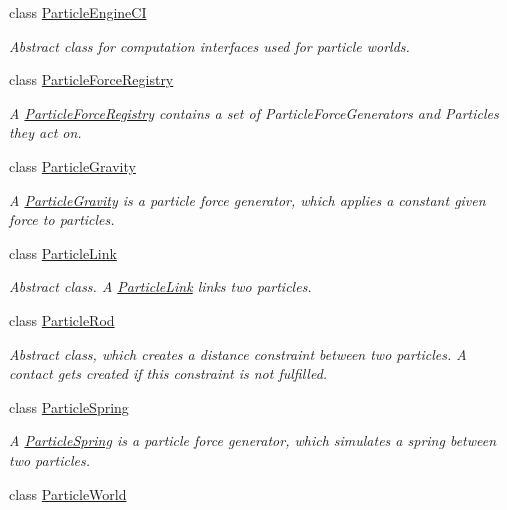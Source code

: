 \begin{DoxyCompactItemize}
class \mbox{\hyperlink{classr3_1_1_particle_engine_c_i}{Particle\+Engine\+CI}}
\begin{DoxyCompactList}\small\item\em Abstract class for computation interfaces used for particle worlds. \end{DoxyCompactList}\item 
class \mbox{\hyperlink{classr3_1_1_particle_force_registry}{Particle\+Force\+Registry}}
\begin{DoxyCompactList}\small\item\em A \mbox{\hyperlink{classr3_1_1_particle_force_registry}{Particle\+Force\+Registry}} contains a set of Particle\+Force\+Generators and Particles they act on. \end{DoxyCompactList}\item 
class \mbox{\hyperlink{classr3_1_1_particle_gravity}{Particle\+Gravity}}
\begin{DoxyCompactList}\small\item\em A \mbox{\hyperlink{classr3_1_1_particle_gravity}{Particle\+Gravity}} is a particle force generator, which applies a constant given force to particles. \end{DoxyCompactList}\item 
class \mbox{\hyperlink{classr3_1_1_particle_link}{Particle\+Link}}
\begin{DoxyCompactList}\small\item\em Abstract class. A \mbox{\hyperlink{classr3_1_1_particle_link}{Particle\+Link}} links two particles. \end{DoxyCompactList}\item 
class \mbox{\hyperlink{classr3_1_1_particle_rod}{Particle\+Rod}}
\begin{DoxyCompactList}\small\item\em Abstract class, which creates a distance constraint between two particles. A contact gets created if this constraint is not fulfilled. \end{DoxyCompactList}\item 
class \mbox{\hyperlink{classr3_1_1_particle_spring}{Particle\+Spring}}
\begin{DoxyCompactList}\small\item\em A \mbox{\hyperlink{classr3_1_1_particle_spring}{Particle\+Spring}} is a particle force generator, which simulates a spring between two particles. \end{DoxyCompactList}\item 
class \mbox{\hyperlink{classr3_1_1_particle_world}{Particle\+World}}

\end{DoxyCompactItemize}

